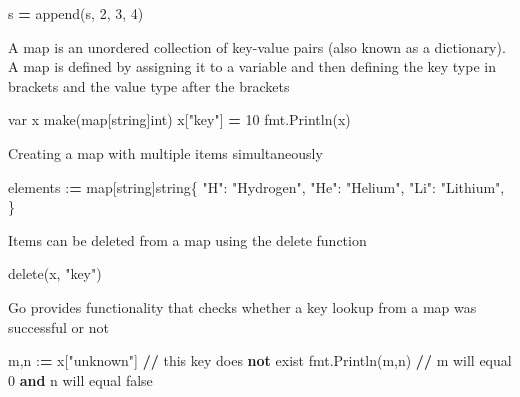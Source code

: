 \documentclass[]{book}
\newenvironment{Shaded}{\begin{snugshade}}{\end{snugshade}}
\newcommand{\KeywordTok}[1]{\textcolor[rgb]{0.13,0.29,0.53}{\textbf{#1}}}
\newcommand{\DecValTok}[1]{\textcolor[rgb]{0.00,0.00,0.81}{#1}}
\newcommand{\StringTok}[1]{\textcolor[rgb]{0.31,0.60,0.02}{#1}}
\newcommand{\OperatorTok}[1]{\textcolor[rgb]{0.81,0.36,0.00}{\textbf{#1}}}
\newcommand{\BuiltInTok}[1]{#1}
\newcommand{\NormalTok}[1]{#1}
\begin{document}
\begin{Shaded}
\begin{Highlighting}[]
\NormalTok{s }\OperatorTok{=}\NormalTok{ append(s, }\DecValTok{2}\NormalTok{, }\DecValTok{3}\NormalTok{, }\DecValTok{4}\NormalTok{)}
\end{Highlighting}
\end{Shaded}

A map is an unordered collection of key-value pairs (also known as a
dictionary). A map is defined by assigning it to a variable and then
defining the key type in brackets and the value type after the brackets

\begin{Shaded}
\begin{Highlighting}[]
\NormalTok{var x make(}\BuiltInTok{map}\NormalTok{[string]}\BuiltInTok{int}\NormalTok{)}
\NormalTok{x[}\StringTok{"key"}\NormalTok{] }\OperatorTok{=} \DecValTok{10} 
\NormalTok{fmt.Println(x)}
\end{Highlighting}
\end{Shaded}

Creating a map with multiple items simultaneously

\begin{Shaded}
\begin{Highlighting}[]
\NormalTok{elements :}\OperatorTok{=} \BuiltInTok{map}\NormalTok{[string]string\{}
  \StringTok{"H"}\NormalTok{:  }\StringTok{"Hydrogen"}\NormalTok{,}
  \StringTok{"He"}\NormalTok{: }\StringTok{"Helium"}\NormalTok{,}
  \StringTok{"Li"}\NormalTok{: }\StringTok{"Lithium"}\NormalTok{,}
\NormalTok{\}}
\end{Highlighting}
\end{Shaded}

Items can be deleted from a map using the delete function

\begin{Shaded}
\begin{Highlighting}[]
\NormalTok{delete(x, }\StringTok{"key"}\NormalTok{)}
\end{Highlighting}
\end{Shaded}

Go provides functionality that checks whether a key lookup from a map
was successful or not

\begin{Shaded}
\begin{Highlighting}[]
\NormalTok{m,n :}\OperatorTok{=}\NormalTok{ x[}\StringTok{"unknown"}\NormalTok{] }\OperatorTok{//}\NormalTok{ this key does }\KeywordTok{not}\NormalTok{ exist}
\NormalTok{fmt.Println(m,n) }\OperatorTok{//}\NormalTok{ m will equal }\DecValTok{0} \KeywordTok{and}\NormalTok{ n will equal false}
\end{Highlighting}
\end{Shaded}
\end{document}
